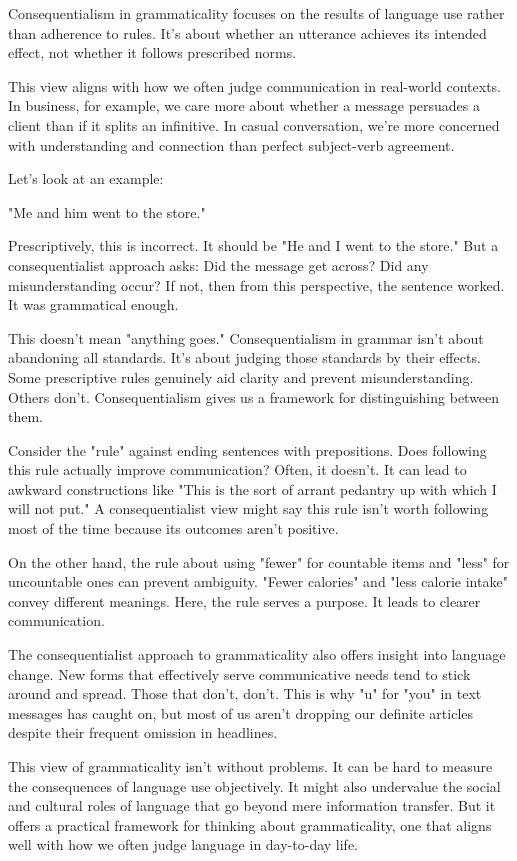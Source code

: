 Consequentialism in grammaticality focuses on the results of language use rather than adherence to rules. It's about whether an utterance achieves its intended effect, not whether it follows prescribed norms.

This view aligns with how we often judge communication in real-world contexts. In business, for example, we care more about whether a message persuades a client than if it splits an infinitive. In casual conversation, we're more concerned with understanding and connection than perfect subject-verb agreement.

Let's look at an example:

"Me and him went to the store."

Prescriptively, this is incorrect. It should be "He and I went to the store." But a consequentialist approach asks: Did the message get across? Did any misunderstanding occur? If not, then from this perspective, the sentence worked. It was grammatical enough.

This doesn't mean "anything goes." Consequentialism in grammar isn't about abandoning all standards. It's about judging those standards by their effects. Some prescriptive rules genuinely aid clarity and prevent misunderstanding. Others don't. Consequentialism gives us a framework for distinguishing between them.

Consider the "rule" against ending sentences with prepositions. Does following this rule actually improve communication? Often, it doesn't. It can lead to awkward constructions like "This is the sort of arrant pedantry up with which I will not put." A consequentialist view might say this rule isn't worth following most of the time because its outcomes aren't positive.

On the other hand, the rule about using "fewer" for countable items and "less" for uncountable ones can prevent ambiguity. "Fewer calories" and "less calorie intake" convey different meanings. Here, the rule serves a purpose. It leads to clearer communication.

The consequentialist approach to grammaticality also offers insight into language change. New forms that effectively serve communicative needs tend to stick around and spread. Those that don't, don't. This is why "u" for "you" in text messages has caught on, but most of us aren't dropping our definite articles despite their frequent omission in headlines.

This view of grammaticality isn't without problems. It can be hard to measure the consequences of language use objectively. It might also undervalue the social and cultural roles of language that go beyond mere information transfer. But it offers a practical framework for thinking about grammaticality, one that aligns well with how we often judge language in day-to-day life.

